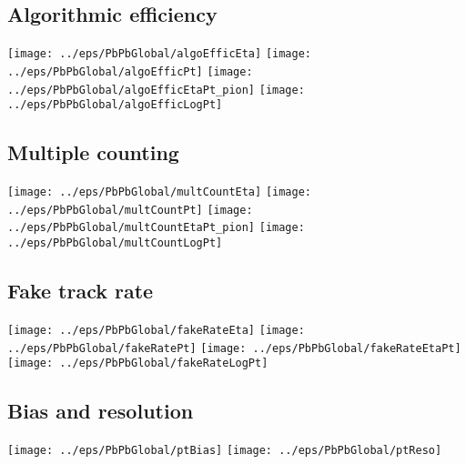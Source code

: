 \documentclass[landscape]{article}
\begin{document}
\subsection{Algorithmic efficiency}
 \texttt{[image: ../eps/PbPbGlobal/algoEfficEta]}
 \texttt{[image: ../eps/PbPbGlobal/algoEfficPt]}
 \texttt{[image: ../eps/PbPbGlobal/algoEfficEtaPt\_pion]}
 \texttt{[image: ../eps/PbPbGlobal/algoEfficLogPt]}
 \newpage

\subsection{Multiple counting}
 \texttt{[image: ../eps/PbPbGlobal/multCountEta]}
 \texttt{[image: ../eps/PbPbGlobal/multCountPt]}
 \texttt{[image: ../eps/PbPbGlobal/multCountEtaPt\_pion]}
 \texttt{[image: ../eps/PbPbGlobal/multCountLogPt]}
 \newpage

\subsection{Fake track rate}
 \texttt{[image: ../eps/PbPbGlobal/fakeRateEta]}
 \texttt{[image: ../eps/PbPbGlobal/fakeRatePt]}
 \texttt{[image: ../eps/PbPbGlobal/fakeRateEtaPt]}
 \texttt{[image: ../eps/PbPbGlobal/fakeRateLogPt]}
 \newpage

\subsection{Bias and resolution}
 \texttt{[image: ../eps/PbPbGlobal/ptBias]}
 \texttt{[image: ../eps/PbPbGlobal/ptReso]}
 \newpage
\end{document}
